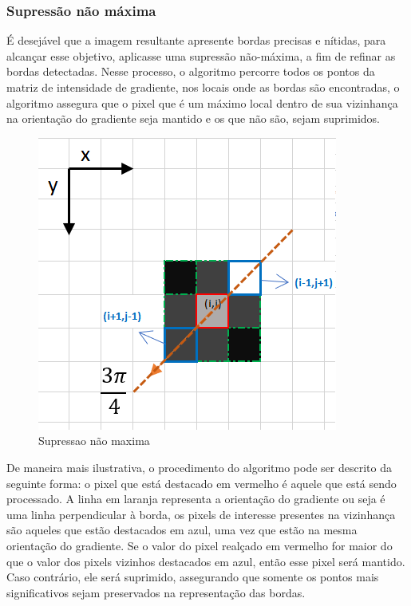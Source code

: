 \newpage


\subsubsection[Supressão não máxima]{Supressão não máxima}


É desejável que a imagem resultante apresente bordas precisas e nítidas, para alcançar esse objetivo, aplicasse uma supressão não-máxima, a fim de refinar as bordas detectadas. Nesse processo, o algoritmo percorre todos os pontos da matriz de intensidade de gradiente, nos locais onde as bordas são encontradas, o algoritmo  assegura que o pixel que é um máximo local dentro de sua vizinhança na orientação do gradiente seja mantido e os que não são, sejam suprimidos\cite{canny-edge-detection-python}.



\begin{figure}[!ht]
	\centering
	\includegraphics[scale=0.65]{figuras/filter/supressao_nao_maxima/supressao3.png}
	\caption{Supressao não maxima}
	\label{fig:Supressao nao maxima}
\end{figure}
\newpage


De maneira mais ilustrativa, o procedimento do algoritmo pode ser descrito da seguinte forma: o pixel que está destacado em vermelho é aquele que está sendo processado. A linha em laranja representa a orientação do gradiente ou seja é uma linha perpendicular à borda, os pixels de interesse presentes na vizinhança são aqueles que estão destacados em azul, uma vez que estão na mesma orientação do gradiente. Se o valor do pixel realçado em vermelho for maior do que o valor dos pixels vizinhos destacados em azul, então esse pixel será mantido. Caso contrário, ele será suprimido, assegurando que somente os pontos mais significativos sejam preservados na representação das bordas\cite{canny-edge-detection-python}.




